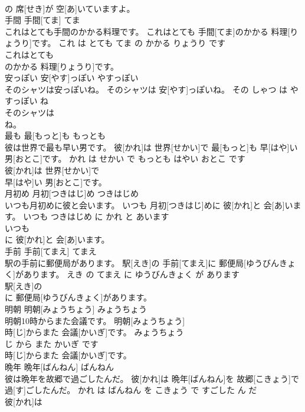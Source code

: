 \documentclass[8pt]{extreport}
\begin{document}
\begin{CJK}{UTF8}{min}
\\	の 席[せき]が 空[あ]いていますよ。			
\\	手間	手間[てま]	てま	
\\	これはとても手間のかかる料理です。	これはとても 手間[てま]のかかる 料理[りょうり]です。	これ は とても てま の かかる りょうり です	
\\	これはとても
\\	のかかる 料理[りょうり]です。			
\\	安っぽい	安[やす]っぽい	やすっぽい	
\\	そのシャツは安っぽいね。	そのシャツは 安[やす]っぽいね。	その しゃつ は やすっぽい ね	
\\	そのシャツは
\\	ね。			
\\	最も	最[もっと]も	もっとも	
\\	彼は世界で最も早い男です。	彼[かれ]は 世界[せかい]で 最[もっと]も 早[はや]い 男[おとこ]です。	かれ は せかい で もっとも はやい おとこ です	
\\	彼[かれ]は 世界[せかい]で
\\	早[はや]い 男[おとこ]です。			
\\	月初め	月初[つきはじ]め	つきはじめ	
\\	いつも月初めに彼と会います。	いつも 月初[つきはじ]めに 彼[かれ]と 会[あ]います。	いつも つきはじめ に かれ と あいます	
\\	いつも
\\	に 彼[かれ]と 会[あ]います。			
\\	手前	手前[てまえ]	てまえ	
\\	駅の手前に郵便局があります。	駅[えき]の 手前[てまえ]に 郵便局[ゆうびんきょく]があります。	えき の てまえ に ゆうびんきょく が あります	
\\	駅[えき]の
\\	に 郵便局[ゆうびんきょく]があります。			
\\	明朝	明朝[みょうちょう]	みょうちょう	
\\	明朝10時からまた会議です。	明朝[みょうちょう] 
\\	時[じ]からまた 会議[かいぎ]です。	みょうちょう 
\\	じ から また かいぎ です	
\\	時[じ]からまた 会議[かいぎ]です。			
\\	晩年	晩年[ばんねん]	ばんねん	
\\	彼は晩年を故郷で過ごしたんだ。	彼[かれ]は 晩年[ばんねん]を 故郷[こきょう]で 過[す]ごしたんだ。	かれ は ばんねん を こきょう で すごした ん だ	
\\	彼[かれ]は

\end{CJK}
\end{document}
